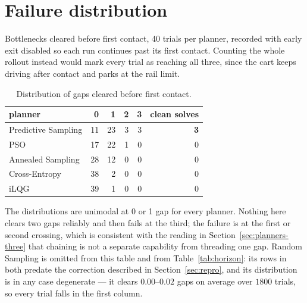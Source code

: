 \documentclass[conference]{IEEEtran}
\begin{document}
\section{Failure distribution}
\label{app:outcomes}

Bottlenecks cleared before first contact, 40 trials per planner, recorded with
early exit disabled so each run continues past its first contact. Counting the
whole rollout instead would mark every trial as reaching all three, since the
cart keeps driving after contact and parks at the rail limit.

\begin{table}[h]
\caption{Distribution of gaps cleared before first contact.}
\label{tab:outcomes}
\centering
\begin{tabular}{@{}lrrrrr@{}}
\toprule
planner & 0 & 1 & 2 & 3 & clean solves \\
\midrule
Predictive Sampling & 11 & 23 & 3 & 3 & \textbf{3} \\
PSO                 & 17 & 22 & 1 & 0 & 0 \\
Annealed Sampling   & 28 & 12 & 0 & 0 & 0 \\
Cross-Entropy       & 38 & 2  & 0 & 0 & 0 \\
iLQG                & 39 & 1  & 0 & 0 & 0 \\
\bottomrule
\end{tabular}
\end{table}

The distributions are unimodal at 0 or 1 gap for every planner. Nothing here
clears two gaps reliably and then fails at the third; the failure is at the
first or second crossing, which is consistent with the reading in
Section~\ref{sec:planners-three} that chaining is not a separate capability from
threading one gap. Random Sampling is omitted from this table and from
Table~\ref{tab:horizon}: its rows in both predate the correction described in
Section~\ref{sec:repro}, and its distribution is in any case degenerate --- it
clears $0.00$--$0.02$ gaps on average over $1800$ trials, so every trial falls
in the first column.
\end{document}
